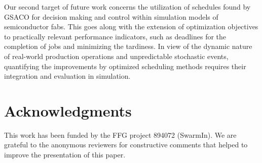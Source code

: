 \documentclass[runningheads]{llncs}
\begin{document}
Our second target of future work concerns the utilization of schedules 
found by GSACO for decision making and control within simulation models
of semiconductor fabs.
This goes along with the extension of optimization objectives to
practically relevant performance indicators, such as deadlines for the
completion of jobs and minimizing the tardiness.
In view of the dynamic nature of real-world production operations and
unpredictable stochastic events,
quantifying the improvements by optimized scheduling methods
requires their integration and evaluation in simulation.


\section*{Acknowledgments}

This work has been funded by the FFG project 894072 (SwarmIn).
We are grateful to the anonymous reviewers for constructive 
comments that helped to improve the presentation of this paper.




%
%
%
% 
% 
%

\end{document}
